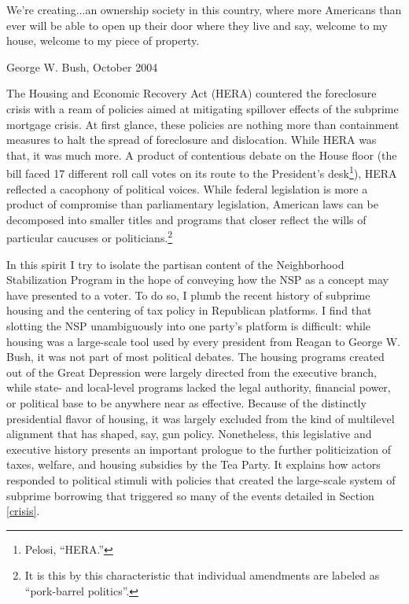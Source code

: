 \documentclass[12pt,oneside]{psthesis}
\begin{document}
\epigraph{We're creating...an ownership society in this country, where more Americans than ever will be able to open up their door where they live and say, welcome to my house, welcome to my piece of property.}{George W. Bush, October 2004}

The Housing and Economic Recovery Act (HERA) countered the foreclosure crisis with a ream of policies aimed at mitigating spillover effects of the subprime mortgage crisis.
At first glance, these policies are nothing more than containment measures to halt the spread of foreclosure and dislocation.
While HERA was that, it was much more.
A product of contentious debate on the House floor (the bill faced 17 different roll call votes on its route to the President's desk\footnote{Pelosi, ``HERA.''}), HERA reflected a cacophony of political voices.
While federal legislation is more a product of compromise than parliamentary legislation, American laws can be decomposed into smaller titles and programs that closer reflect the wills of particular caucuses or politicians.\footnote{It is this by this characteristic that individual amendments are labeled as ``pork-barrel politics''.}

In this spirit I try to isolate the partisan content of the Neighborhood Stabilization Program in the hope of conveying how the NSP as a concept may have presented to a voter.
To do so, I plumb the recent history of subprime housing and the centering of tax policy in Republican platforms.
I find that slotting the NSP unambiguously into one party's platform is difficult: while housing was a large-scale tool used by every president from Reagan to George W. Bush, it was not part of most political debates.
The housing programs created out of the Great Depression were largely directed from the executive branch, while state- and local-level programs lacked the legal authority, financial power, or political base to be anywhere near as effective.
Because of the distinctly presidential flavor of housing, it was largely excluded from the kind of multilevel alignment that has shaped, say, gun policy.
Nonetheless, this legislative and executive history presents an important prologue to the further politicization of taxes, welfare, and housing subsidies by the Tea Party.
It explains how actors responded to political stimuli with policies that created the large-scale system of subprime borrowing that triggered so many of the events detailed in Section \ref{crisis}.
\end{document}
